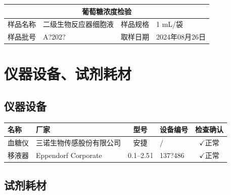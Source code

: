 \documentclass[UTF8,10pt,a4paper,fontset=fandol]{ctexart}
\newcommand{\fieldvalue}[1]{#1}
\newcommand{\handwritten}[1]{#1}
\begin{document}
\begin{tabularx}{\textwidth}{|l|X|l|X|}
\hline
\multicolumn{4}{|c|}{葡萄糖浓度检验} \\ \hline
样品名称 &
\fieldvalue{二级生物反应器细胞液} &
样品规格 &
\fieldvalue{1 mL/袋} \\ \hline
样品批号 &
\fieldvalue{\handwritten{A?202?}} &
取样日期 &
\fieldvalue{\handwritten{2024年08月26日}} \\ \hline
\end{tabularx}

\section{仪器设备、试剂耗材}

\subsection{仪器设备}

\begin{tabularx}{\textwidth}{|l|X|c|X|c|}
\hline
名称 & 厂家 & 型号 & 设备编号 & 检查确认 \\ \hline
血糖仪 &
\fieldvalue{三诺生物传感股份有限公司} &
\fieldvalue{安捷} &
\fieldvalue{\handwritten{/}} &
\fieldvalue{\(\checkmark\)正常} \\ \hline
移液器 &
\fieldvalue{Eppendorf Corporate} &
\fieldvalue{0.1--2.5\,\textmu l} &
\fieldvalue{\handwritten{137?486}} &
\fieldvalue{\(\checkmark\)正常} \\ \hline
\end{tabularx}

\subsection{试剂耗材}
\end{document}
